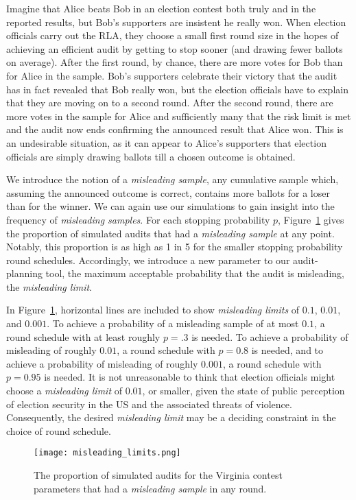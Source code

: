 Imagine that Alice beats Bob in an election contest both truly and in the reported results, but Bob's supporters are insistent he really won. When election officials carry out the RLA, they choose a small first round size in the hopes of achieving an efficient audit by getting to stop sooner (and drawing fewer ballots on average). After the first round, by chance, there are more votes for Bob than for Alice in the sample. Bob's supporters celebrate their victory that the audit has in fact revealed that Bob really won, but the election officials have to explain that they are moving on to a second round. After the second round, there are more votes in the sample for Alice and sufficiently many that the risk limit is met and the audit now ends confirming the announced result that Alice won. This is an undesirable situation, as it can appear to Alice's supporters that election officials are simply drawing ballots till a chosen outcome is obtained. 

We introduce the notion of a \emph{misleading sample}, any cumulative sample which, assuming the announced outcome is correct, contains more ballots for a loser than for the winner.
We can again use our simulations to gain insight into the frequency of \emph{misleading samples}.
For each stopping probability $p$, Figure~\ref{fig:misleading} gives the proportion of simulated audits that had a \emph{misleading sample} at any point. 
Notably, this proportion is as high as 1 in 5 for the smaller stopping probability round schedules.
Accordingly, we introduce a new parameter to our audit-planning tool, the maximum acceptable probability that the audit is misleading, the \emph{misleading limit}.

In Figure~\ref{fig:misleading}, horizontal lines are included to show \emph{misleading limits} of $0.1$, $0.01$, and $0.001$.
To achieve a probability of a misleading sample of at most $0.1$, a round schedule with at least roughly $p=.3$ is needed.
To achieve a probability of misleading of roughly $0.01$, a round schedule with $p=0.8$ is needed, and to achieve a probability of misleading of roughly $0.001$, a round schedule with $p=0.95$ is needed.
It is not unreasonable to think that election officials might choose a \emph{misleading limit} of $0.01$, or smaller, given the state of public perception of election security in the US and the associated threats of violence.
Consequently, the desired \emph{misleading limit} may be a deciding constraint in the choice of round schedule. 

\begin{figure}
\texttt{[image: misleading\_limits.png]}
\caption{The proportion of simulated \Providence audits for the Virginia contest parameters that had a \emph{misleading sample} in any round.}
\label{fig:misleading}
\end{figure}

